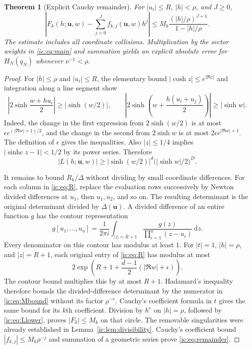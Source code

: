\documentclass[11pt,a4paper]{article}
\numberwithin{equation}{section}
\newtheorem{theorem}{Theorem}[section]
\theoremstyle{definition}
\theoremstyle{remark}
\newcommand{\dd}{\mathrm d}
\newcommand{\Del}{\Delta}
\newcommand{\bu}{\boldsymbol u}
\newcommand{\sinhc}{\operatorname{sinhc}}
\begin{document}
\begin{theorem}[Explicit Cauchy remainder]\label{ic:thm:bound}
For $|u_i|\le R$, $|h|<\rho$, and $J\ge0$,
\begin{equation}\label{ic:eq:remainder}
 \left|F_k(h;\bu,w)-\sum_{j=0}^Jf_{k,j}(\bu,w)h^j\right|
 \le M_k\frac{(|h|/\rho)^{J+1}}{1-|h|/\rho}.
\end{equation}
The estimate includes all coordinate collisions. Multiplication by the
sector weights in \eqref{ic:eq:main} and summation yields an explicit
absolute error for $H_N(q_N)$ whenever $\nu^{-1}<\rho$.
\end{theorem}
\begin{proof}
For $|h|\le\rho$ and $|u_i|\le R$, the elementary bound
$|\cosh z|\le e^{|\Re z|}$ and integration along a line segment show
\[
 \left|2\sinh\frac{w+hu_i}{2}\right|\ge|\sinh(w/2)|,
 \qquad
 \left|2\sinh\left(w+\frac{h(u_i+u_j)}2\right)\right|
 \ge|\sinh w|.
\]
Indeed, the change in the first expression from $2\sinh(w/2)$ is at most
$\epsilon e^{(|\Re w|+1)/2}$, and the change in the second from
$2\sinh w$ is at most $2\epsilon e^{|\Re w|+1}$. The definition of
$\epsilon$ gives the inequalities. Also $|z|\le1/4$ implies
$|\sinhc z-1|<1/2$ by its power series. Therefore
\begin{equation}\label{ic:eq:Llower}
 |L(h;\bu,w)|\ge
 |\sinh(w/2)|^d\bigl(|\sinh w|/2\bigr)^D.
\end{equation}

It remains to bound $R_k/\Del$ without dividing by small coordinate
differences. For each column in \eqref{ic:eq:R}, replace the evaluation rows
successively by Newton divided differences at
$u_1$, then $u_1,u_2$, and so on. The resulting determinant is the original
determinant divided by $\Del(\bu)$. A divided difference of an entire
function $g$ has the contour representation
\[
 g[u_1,\ldots,u_a]=\frac{1}{2\pi i}
 \int_{|z|=R+1}\frac{g(z)}{\prod_{i=1}^a(z-u_i)}\,\dd z.
\]
Every denominator on this contour has modulus at least $1$. For
$|t|=1$, $|h|=\rho$, and $|z|=R+1$, each original entry of
\eqref{ic:eq:R} has modulus at most
\[
 2\exp\left(R+1+\frac{d-1}{2}(|\Re w|+\epsilon)\right).
\]
The contour bound multiplies this by at most $R+1$. Hadamard's inequality
therefore bounds the divided-difference determinant by the numerator
in \eqref{ic:eq:Mbound} without its factor $\rho^{-e}$. Cauchy's
coefficient formula in $t$ gives the same bound for its $k$th
coefficient. Division by $h^e$ on $|h|=\rho$, followed by
\eqref{ic:eq:Llower}, proves $|F_k|\le M_k$ on that circle. The removable
singularities were already established in Lemma~\ref{ic:lem:divisibility}.
Cauchy's coefficient bound $|f_{k,j}|\le M_k\rho^{-j}$ and summation of a
geometric series prove \eqref{ic:eq:remainder}.
\end{proof}
\end{document}
